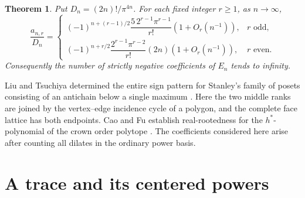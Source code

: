 \documentclass[11pt]{article}
\newtheorem{theorem}{Theorem}
\begin{document}
\begin{theorem}\label{fixed}
Put \(D_n=(2n)!/\pi^{4n}\). For each fixed integer \(r\ge1\), as \(n\to\infty\),
\[
\frac{a_{n,r}}{D_n} =
\begin{cases}
 (-1)^{n+(r-1)/2}\dfrac{5\,2^{r-1}\pi^{r-1}}{r!}
 (1+O_r(n^{-1})), &r\text{ odd},\\[4pt]
 (-1)^{n+r/2}\dfrac{2^{r-1}\pi^{r-2}}{r!}(2n)
 (1+O_r(n^{-1})), &r\text{ even}.
\end{cases}
\]
Consequently the number of strictly negative coefficients of \(E_n\)
tends to infinity.
\end{theorem}

Liu and Tsuchiya determined the entire sign pattern for Stanley's family
of posets consisting of an antichain below a single maximum \cite{liu}.
Here the two middle ranks are joined by the vertex--edge incidence cycle
of a polygon, and the complete face lattice has both endpoints.
Cao and Fu establish real-rootedness for the \(h^*\)-polynomial of the
crown order polytope \cite{cao}. The coefficients considered here arise
after counting all dilates in the ordinary power basis.

\section{A trace and its centered powers}
\end{document}
